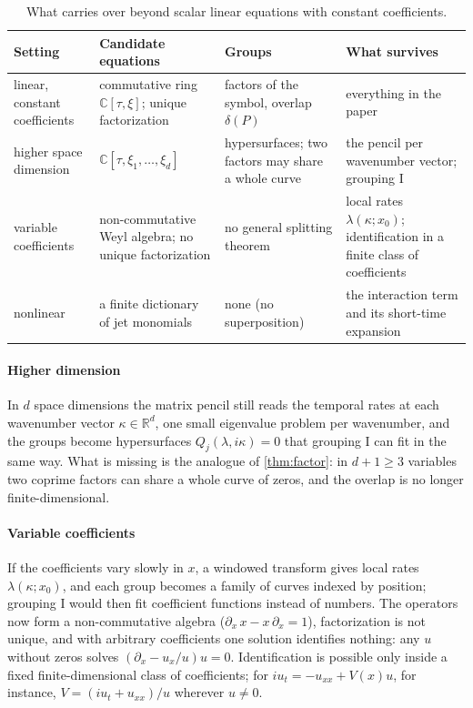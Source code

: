\documentclass[11pt]{article}
\theoremstyle{plain}
\theoremstyle{definition}
\theoremstyle{remark}
\newcommand{\R}{\mathbb{R}}
\newcommand{\C}{\mathbb{C}}
\newcommand{\deltaP}{\delta(P)}             %
\begin{document}
\begin{table}[htbp]
\centering\small
\caption{What carries over beyond scalar linear equations with constant coefficients.}\label{sm:tab:beyond}
\begin{tabularx}{\linewidth}{@{}>{\raggedright\arraybackslash}p{2.1cm}>{\raggedright\arraybackslash}X>{\raggedright\arraybackslash}X>{\raggedright\arraybackslash}X@{}}
\toprule
Setting & Candidate equations & Groups & What survives\\
\midrule
linear, constant coefficients & commutative ring $\C[\tau,\xi]$; unique factorization & factors of the symbol, overlap
$\deltaP$ & everything in the paper\\
higher space dimension & $\C[\tau,\xi_1,\dots,\xi_d]$ & hypersurfaces; two factors may share a whole curve & the pencil per
wavenumber vector; grouping I\\
variable coefficients & non-commutative Weyl algebra; no unique factorization & no general splitting theorem & local rates
$\lambda(\kappa;x_0)$; identification in a finite class of coefficients\\
nonlinear & a finite dictionary of jet monomials & none (no superposition) & the interaction term and its short-time
expansion\\
\bottomrule
\end{tabularx}
\end{table}

\paragraph{Higher dimension} In $d$ space dimensions the matrix pencil still reads the temporal rates at each wavenumber
vector $\kappa\in\R^d$, one small eigenvalue problem per wavenumber, and the groups become hypersurfaces
$Q_j(\lambda,i\kappa)=0$ that grouping I can fit in the same way. What is missing is the analogue of
\cref{thm:factor}: in $d+1\ge3$ variables two coprime factors can share a whole curve of zeros, and the overlap is no
longer finite-dimensional.

\paragraph{Variable coefficients} If the coefficients vary slowly in $x$, a windowed transform gives local rates
$\lambda(\kappa;x_0)$, and each group becomes a family of curves indexed by position; grouping I would then fit
coefficient functions instead of numbers. The operators now form a non-commutative algebra ($\partial_x\,x-x\,\partial_x=1$),
factorization is not unique, and with arbitrary coefficients one solution identifies nothing: any $u$ without zeros solves
$(\partial_x-u_x/u)u=0$. Identification is possible only inside a fixed finite-dimensional class of coefficients; for
$iu_t=-u_{xx}+V(x)u$, for instance, $V=(iu_t+u_{xx})/u$ wherever $u\neq0$.
\end{document}
